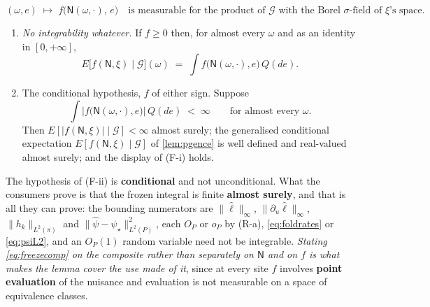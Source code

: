 \begin{lemma}
\begin{equation}
(\omega,e)\;\longmapsto\;f\big(\mathsf N(\omega,\cdot),\,e\big)
\quad\text{is measurable for the product of }\mathcal G\text{ with the Borel }\sigma\text{-field of }
\xi\text{'s space.}
\end{equation}
\begin{enumerate}
\item[\textup{(F-i)}] \emph{No integrability whatever.} If $f\ge0$ then, for almost every $\omega$ and as
an identity in $[0,+\infty]$,
\[
E\big[f(\mathsf N,\xi)\mid\mathcal G\big](\omega)\;=\;\int f\big(\mathsf N(\omega,\cdot),e\big)\,Q(de).
\]
\item[\textup{(F-ii)}] The conditional hypothesis, $f$ of either sign. Suppose
\[
\int\big|f\big(\mathsf N(\omega,\cdot),e\big)\big|\,Q(de)\;<\;\infty
\qquad\text{for almost every }\omega .
\]
Then $E[|f(\mathsf N,\xi)|\mid\mathcal G]<\infty$ almost surely; the generalised conditional expectation
$E[f(\mathsf N,\xi)\mid\mathcal G]$ of \cref{lem:pgence} is well defined and real-valued almost surely; and the
display of \textup{(F-i)} holds.
\end{enumerate}
The hypothesis of \textup{(F-ii)} is \textbf{conditional} and not unconditional. What the consumers
prove is that the frozen integral is finite \textbf{almost surely}, and that is all they can prove: the
bounding numerators are $\|\hat\ell\|_\infty$, $\|\partial_u\hat\ell\|_\infty$, $\|h_k\|_{L^{2}(\pi)}$ and
$\|\hat\psi-\psi_\star\|^{2}_{L^{2}(P)}$, each $O_P$ or $o_P$ by (R-a), \eqref{eq:foldrates} or
\eqref{eq:psiL2}, and an $O_P(1)$ random variable need not be integrable. \emph{Stating
\eqref{eq:freezecomp} on the composite rather than separately on $\mathsf N$ and on $f$ is what makes the lemma
cover the use made of it}, since at every site $f$ involves \textbf{point evaluation} of the nuisance and
evaluation is not measurable on a space of equivalence classes.
\end{lemma}

